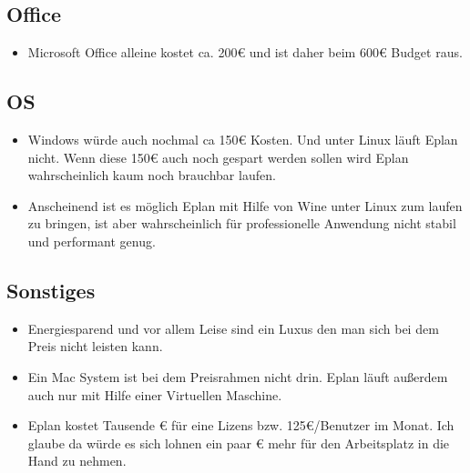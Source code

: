 \documentclass[11pt]{article}
\begin{document}
\subsection{Office}
\label{sec:orgaec3328}
\begin{itemize}
\item Microsoft Office alleine kostet ca. 200€ und ist daher beim 600€ Budget raus.
\end{itemize}
\subsection{OS}
\label{sec:orgabaf0cb}
\begin{itemize}
\item Windows würde auch nochmal ca 150€ Kosten. Und unter Linux läuft Eplan nicht. Wenn diese 150€ auch noch gespart werden sollen wird Eplan wahrscheinlich kaum noch brauchbar laufen.
\item Anscheinend ist es möglich Eplan mit Hilfe von Wine unter Linux zum laufen zu bringen, ist aber wahrscheinlich für professionelle Anwendung nicht stabil und performant genug.
\end{itemize}

\subsection{Sonstiges}
\label{sec:org062877a}
\begin{itemize}
\item Energiesparend und vor allem Leise sind ein Luxus den man sich bei dem Preis nicht leisten kann.
\item Ein Mac System ist bei dem Preisrahmen nicht drin. Eplan läuft außerdem auch nur mit Hilfe einer Virtuellen Maschine.
\item Eplan kostet Tausende € für eine Lizens bzw. 125€/Benutzer im Monat. Ich glaube da würde es sich lohnen ein paar € mehr für den Arbeitsplatz in die Hand zu nehmen.
\end{itemize}
\end{document}
